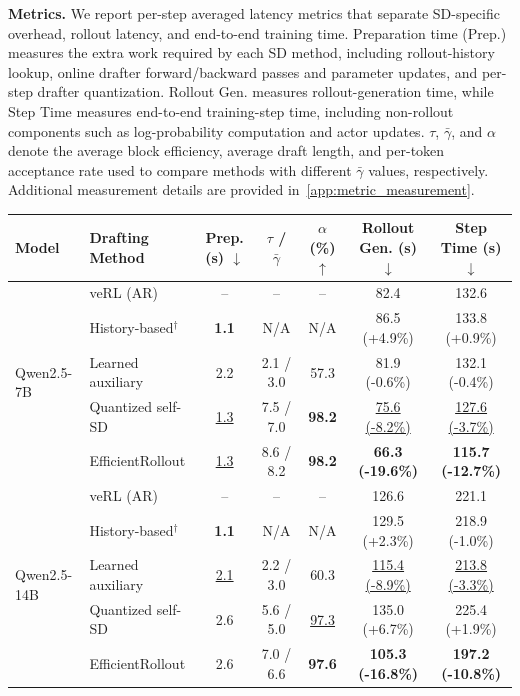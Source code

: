 \documentclass{llmxive}
\providecommand{\methodtitle}{EfficientRollout}
\providecommand{\nosd}{veRL (AR)}
\providecommand{\Alwayssd}{Quantized self-SD}
\providecommand{\mal}{\tau}
\providecommand{\arraystretch}{1.18}
\begin{document}
\textbf{Metrics.}
We report per-step averaged latency metrics that separate SD-specific overhead, rollout latency, and end-to-end training time.
Preparation time (Prep.) measures the extra work required by each SD method, including rollout-history lookup, online drafter forward/backward passes and parameter updates, and per-step drafter quantization.
Rollout Gen. measures rollout-generation time, while Step Time measures end-to-end training-step time, including non-rollout components such as log-probability computation and actor updates.
$\mal$, $\bar{\gamma}$, and $\alpha$ denote the average block efficiency, average draft length, and per-token acceptance rate used to compare methods with different $\bar{\gamma}$ values, respectively.
Additional measurement details are provided in~\cref{app:metric_measurement}.

\begin{table}[t]
\centering
\footnotesize
\setlength{\tabcolsep}{3.6pt}
\renewcommand{\arraystretch}{1.08}
\begin{tabular}{llccccc}
\toprule
\textbf{Model}
&
\textbf{Drafting Method}
&
\textbf{Prep. (s) $\downarrow$}
&
\textbf{$\mal$ / $\bar{\gamma}$}
&
\textbf{$\alpha$ (\%) $\uparrow$}
&
\textbf{Rollout Gen. (s) $\downarrow$}
&
\textbf{Step Time (s) $\downarrow$} \\
\midrule

\multirow{5}{*}{Qwen2.5-7B}
& \nosd{}
& --
& --
& --
& 82.4
& 132.6 \\
& History-based$^\dagger$
& \textbf{1.1}
& N/A
& N/A
& 86.5 (+4.9\%)
& 133.8 (+0.9\%) \\
& Learned auxiliary
& 2.2
& 2.1 / 3.0
& 57.3
& 81.9 (-0.6\%)
& 132.1 (-0.4\%) \\
& \Alwayssd{}
& \underline{1.3}
& 7.5 / 7.0
& \textbf{98.2}
& \underline{75.6 (-8.2\%)}
& \underline{127.6 (-3.7\%)} \\
\rowcolor{gray!10}
\cellcolor{white}
& \methodtitle{}
& \underline{1.3}
& 8.6 / 8.2
& \textbf{98.2}
& \textbf{66.3 (-19.6\%)}
& \textbf{115.7 (-12.7\%)} \\

\midrule

\multirow{5}{*}{Qwen2.5-14B}
& \nosd{}
& --
& --
& --
& 126.6
& 221.1 \\
& History-based$^\dagger$
& \textbf{1.1}
& N/A
& N/A
& 129.5 (+2.3\%)
& 218.9 (-1.0\%) \\
& Learned auxiliary
& \underline{2.1}
& 2.2 / 3.0
& 60.3
& \underline{115.4 (-8.9\%)}
& \underline{213.8 (-3.3\%)} \\
& \Alwayssd{}
& 2.6
& 5.6 / 5.0
& \underline{97.3}
& 135.0 (+6.7\%)
& 225.4 (+1.9\%) \\
\rowcolor{gray!10}
\cellcolor{white}
& \methodtitle{}
& 2.6
& 7.0 / 6.6
& \textbf{97.6}
& \textbf{105.3 (-16.8\%)}
& \textbf{197.2 (-10.8\%)} \\


\end{tabular}
\end{table}
\end{document}
